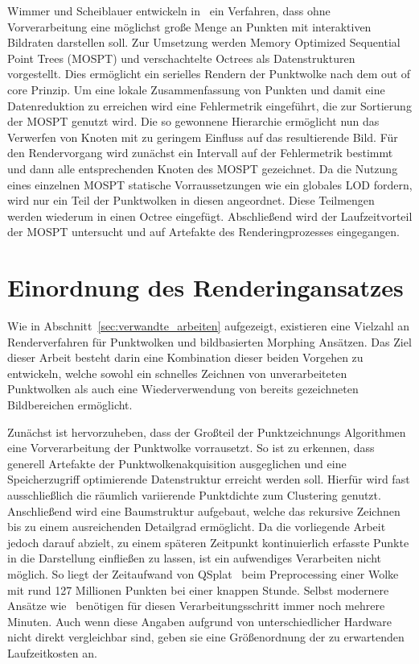 \documentclass[hyperref, beleg, german, final, twoside]{cgvpub}
\begin{document}
Wimmer und Scheiblauer entwickeln in~\cite{wimmer2006instant} ein Verfahren,
dass ohne Vorverarbeitung eine möglichst große Menge an Punkten mit
interaktiven Bildraten darstellen soll. Zur Umsetzung werden Memory Optimized
Sequential Point Trees (MOSPT) und verschachtelte Octrees als Datenstrukturen
vorgestellt. Dies ermöglicht ein serielles Rendern der Punktwolke nach dem out
of core Prinzip. Um eine lokale Zusammenfassung von Punkten und damit eine
Datenreduktion zu erreichen wird eine Fehlermetrik eingeführt, die zur
Sortierung der MOSPT genutzt wird. Die so gewonnene Hierarchie ermöglicht nun
das Verwerfen von Knoten mit zu geringem Einfluss auf das resultierende Bild.
Für den Rendervorgang wird zunächst ein Intervall auf der Fehlermetrik bestimmt
und dann alle entsprechenden Knoten des MOSPT gezeichnet. Da die Nutzung eines
einzelnen MOSPT statische Vorraussetzungen wie ein globales LOD fordern, wird
nur ein Teil der Punktwolken in diesen angeordnet. Diese Teilmengen werden
wiederum in einen Octree eingefügt. Abschließend wird der Laufzeitvorteil der
MOSPT untersucht und auf Artefakte des Renderingprozesses eingegangen.

\section{Einordnung des Renderingansatzes}

Wie in Abschnitt~\ref{sec:verwandte_arbeiten} aufgezeigt, existieren eine
Vielzahl an Renderverfahren für Punktwolken und bildbasierten Morphing
Ansätzen. Das Ziel dieser Arbeit besteht darin eine Kombination dieser beiden
Vorgehen zu entwickeln, welche sowohl ein schnelles Zeichnen von
unverarbeiteten Punktwolken als auch eine Wiederverwendung von bereits
gezeichneten Bildbereichen ermöglicht.

Zunächst ist hervorzuheben, dass der Großteil der Punktzeichnungs Algorithmen
eine Vorverarbeitung der Punktwolke vorrausetzt. So ist zu erkennen, dass
generell Artefakte der Punktwolkenakquisition ausgeglichen und eine
Speicherzugriff optimierende Datenstruktur erreicht werden soll. Hierfür wird
fast ausschließlich die räumlich variierende Punktdichte zum Clustering
genutzt. Anschließend wird eine Baumstruktur aufgebaut, welche das rekursive
Zeichnen bis zu einem ausreichenden Detailgrad ermöglicht. Da die vorliegende
Arbeit jedoch darauf abzielt, zu einem späteren Zeitpunkt kontinuierlich
erfasste Punkte in die Darstellung einfließen zu lassen, ist ein aufwendiges
Verarbeiten nicht möglich. So liegt der Zeitaufwand von
QSplat~\cite{rusinkiewicz2000qsplat} beim Preprocessing einer Wolke mit rund
127 Millionen Punkten bei einer knappen Stunde. Selbst modernere Ansätze
wie~\cite{goswami2010high} benötigen für diesen Verarbeitungsschritt immer noch
mehrere Minuten. Auch wenn diese Angaben aufgrund von unterschiedlicher
Hardware nicht direkt vergleichbar sind, geben sie eine Größenordnung der zu
erwartenden Laufzeitkosten an.
\end{document}

